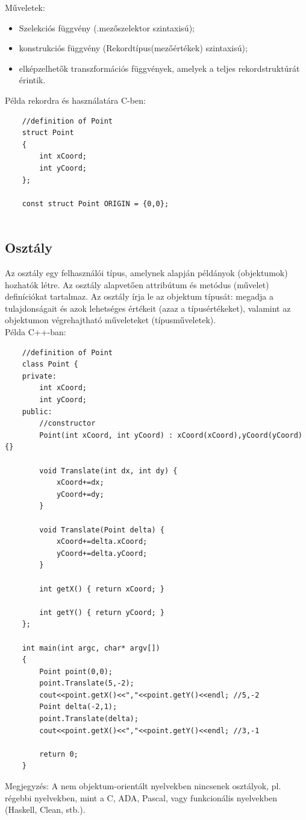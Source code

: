 \documentclass[12pt,margin=0px]{article}
\begin{document}
	\noindent Műveletek:
	\begin{itemize}
		\item	Szelekciós függvény (.mezőszelektor szintaxisú);
		
		\item	konstrukciós függvény (Rekordtípus(mezőértékek) szintaxisú);
		
		\item	elképzelhetők transzformációs függvények, amelyek a teljes rekordstruktúrát érintik.
	\end{itemize}
	
	\noindent Példa rekordra és használatára C-ben:
{\small
	\begin{verbatim}
	//definition of Point
	struct Point
	{
	    int xCoord;
	    int yCoord;
	};
	
	const struct Point ORIGIN = {0,0};
	
	\end{verbatim}
}	
	\subsection{Osztály}
	
	Az osztály egy felhasználói típus, amelynek alapján példányok (objektumok)
	hozhatók létre. Az osztály alapvetően attribútum és metódus (művelet) definíciókat
	tartalmaz. Az osztály írja le az objektum típusát: megadja a tulajdonságait és azok
	lehetséges értékeit (azaz a típusértékeket), valamint az objektumon végrehajtható műveleteket (típusműveletek).\\
	
	\noindent Példa C++-ban:
{\small
	\begin{verbatim}
	//definition of Point
	class Point {
	private:
	    int xCoord;
	    int yCoord;
	public:
	    //constructor
	    Point(int xCoord, int yCoord) : xCoord(xCoord),yCoord(yCoord) {}
	
	    void Translate(int dx, int dy) {
	        xCoord+=dx;
	        yCoord+=dy;
	    }
	
	    void Translate(Point delta) {
	        xCoord+=delta.xCoord;
	        yCoord+=delta.yCoord;
	    }
	
	    int getX() { return xCoord; }
	
	    int getY() { return yCoord; }
	};
	
	int main(int argc, char* argv[])
	{
	    Point point(0,0);
	    point.Translate(5,-2);
	    cout<<point.getX()<<","<<point.getY()<<endl; //5,-2
	    Point delta(-2,1);
	    point.Translate(delta);
	    cout<<point.getX()<<","<<point.getY()<<endl; //3,-1
	
	    return 0;
	}
	\end{verbatim}
}
	{\small \noindent Megjegyzés: A nem objektum-orientált nyelvekben nincsenek osztályok, pl. régebbi nyelvekben, mint a C, ADA, Pascal, vagy
	funkcionális nyelvekben (Haskell, Clean, stb.).}
	
\end{document}
